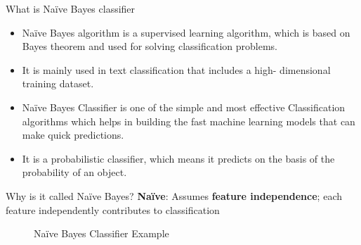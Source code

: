 %
%
%






\begin{frame}{What is Naïve Bayes classifier}
	
	\begin{itemize}
	\item Naïve Bayes algorithm is a supervised learning algorithm, which is based on Bayes theorem and used for solving classification problems. 
	\item It is mainly used in text classification that includes a high- dimensional training dataset.
	\item Naïve Bayes Classifier is one of the simple and most effective Classification algorithms which helps in building the fast machine learning models that can make quick predictions.
	\item It is a probabilistic classifier, which means it predicts on the basis of the probability of an object.
	\end{itemize}

\end{frame}

\begin{frame}{Why is it called Naïve Bayes?}
	\textbf{Naïve}: Assumes \textbf{feature independence}; each feature independently contributes to classification
	
		\begin{figure}
		\centering
		\caption{Naïve Bayes Classifier Example}
		\label{fig:Naïve Bayes Classifier Example}
	\end{figure}
\end{frame}

